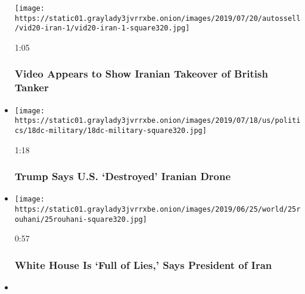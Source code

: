 \begin{itemize}
  \texttt{[image: https://static01.graylady3jvrrxbe.onion/images/2019/07/20/autossell/vid20-iran-1/vid20-iran-1-square320.jpg]}

  1:05

  \hypertarget{video-appears-to-show-iranian-takeover-of-british-tanker}{%
  \subsubsection{Video Appears to Show Iranian Takeover of British
  Tanker}\label{video-appears-to-show-iranian-takeover-of-british-tanker}}
\item
  \href{https://www.nytimes3xbfgragh.onion/video/us/politics/100000006618735/trump-iran-drone.html?action=click\&module=video-series-bar\&region=header\&pgtype=Article\&playlistId=video/us-iran-relations}{}

  \texttt{[image: https://static01.graylady3jvrrxbe.onion/images/2019/07/18/us/politics/18dc-military/18dc-military-square320.jpg]}

  1:18

  \hypertarget{trump-says-us-destroyed-iranian-drone}{%
  \subsubsection{Trump Says U.S. `Destroyed' Iranian
  Drone}\label{trump-says-us-destroyed-iranian-drone}}
\item
  \href{https://www.nytimes3xbfgragh.onion/video/world/middleeast/100000006578503/iran-rouhani-sanctions.html?action=click\&module=video-series-bar\&region=header\&pgtype=Article\&playlistId=video/us-iran-relations}{}

  \texttt{[image: https://static01.graylady3jvrrxbe.onion/images/2019/06/25/world/25rouhani/25rouhani-square320.jpg]}

  0:57

  \hypertarget{white-house-is-full-of-lies-says-president-of-iran}{%
  \subsubsection{White House Is `Full of Lies,' Says President of
  Iran}\label{white-house-is-full-of-lies-says-president-of-iran}}
\item
  \href{https://www.nytimes3xbfgragh.onion/video/us/politics/100000006569822/trump-drone-iran.html?action=click\&module=video-series-bar\&region=header\&pgtype=Article\&playlistId=video/us-iran-relations}{}


\end{itemize}
